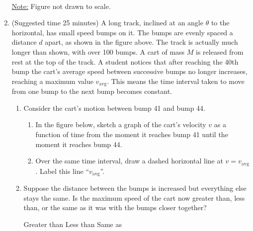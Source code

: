 \documentclass{../../../oss-apphys}
\begin{document}
\begin{enumerate}[leftmargin=15pt]
  
  \begin{center}
    \\
    \underline{Note:} Figure not drawn to scale.
  \end{center}
\item (Suggested time 25 minutes) A long track, inclined at an angle $\theta$
  to the horizontal, has small speed bumps on it. The bumps are evenly spaced a
  distance $d$ apart, as shown in the figure above. The track is actually much
  longer than shown, with over 100 bumps. A cart of mass $M$ is released from
  rest at the top of the track. A student notices that after reaching the
  40th bump the cart's average speed between successive bumps no longer
  increases, reaching a maximum value $v_\mathrm{avg}$. This means the time
  interval taken to move from one bump to the next bump becomes constant.
  \begin{enumerate}[nosep]
  \item Consider the cart's motion between bump 41 and bump 44.
    \begin{enumerate}[nosep]
    \item In the figure below, sketch a graph of the cart's velocity $v$ as a
      function of time from the moment it reaches bump 41 until the moment it
      reaches bump 44.
    \item Over the same time interval, draw a dashed horizontal line at
      $v=v_\text{avg}$. Label this line ``$v_\text{avg}$''.
    \end{enumerate}
    \begin{center}
    \end{center}
  \item Suppose the distance between the bumps is increased but everything else
    stays the same. Is the maximum speed of the cart now greater than, less
    than, or the same as it was with the bumps closer together?

    \vspace{.2in}
    \underline{\hspace{.25in}} Greater than\hspace{.5in}
    \underline{\hspace{.25in}} Less than\hspace{.5in}
    \underline{\hspace{.25in}} Same as


\end{enumerate}
\end{enumerate}
\end{document}
